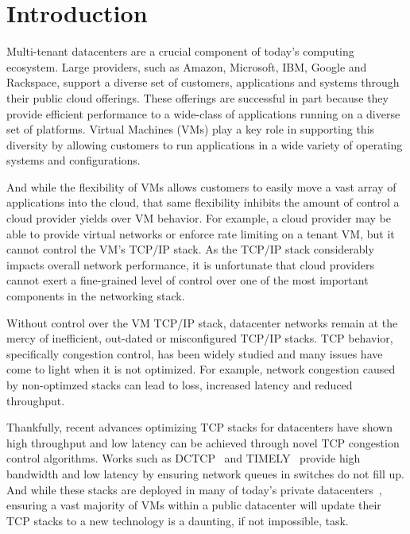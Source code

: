 \section{Introduction}
\label{intro}

Multi-tenant datacenters are a crucial component of today's computing ecosystem. Large providers, such as Amazon, Microsoft, IBM, Google and Rackspace, support
a diverse set of customers, applications and systems through their public cloud offerings. These offerings are successful in 
part because they provide efficient performance to a wide-class of applications running on a diverse set of platforms. Virtual
Machines (VMs) play a key role in supporting this diversity by allowing customers to run applications in a wide variety of 
operating systems and configurations.

And while the flexibility of VMs allows customers to easily move a vast array of applications into the cloud, that same flexibility inhibits the 
amount of control a cloud provider yields over VM behavior. For example, a cloud provider may be able to provide virtual networks or enforce rate limiting
on a tenant VM, but it cannot control the VM's TCP/IP stack. As the TCP/IP stack considerably impacts overall network performance, it 
is unfortunate that cloud providers cannot exert a fine-grained level of control over one of the most important components in the networking stack.

Without control over the VM TCP/IP stack, datacenter networks remain at the mercy of inefficient, out-dated or misconfigured TCP/IP stacks.
TCP behavior, specifically congestion control, has been widely studied and many issues have come to light when it is not optimized. For example,
network congestion caused by non-optimzed stacks can lead to loss, increased latency and reduced throughput. 

Thankfully, recent advances optimizing TCP stacks for datacenters have shown high throughput and low latency can be 
achieved through novel TCP congestion control algorithms. Works such as DCTCP~\cite{dctcp} and TIMELY~\cite{mittal2015timely} provide high
bandwidth and low latency by ensuring network queues in switches do not fill up. And while these stacks are deployed in many of today's 
private datacenters~\cite{singh2015jupiter,judd2015nsdi}, ensuring a vast majority of VMs within a public datacenter will update their TCP stacks
to a new technology is a daunting, if not impossible, task.

